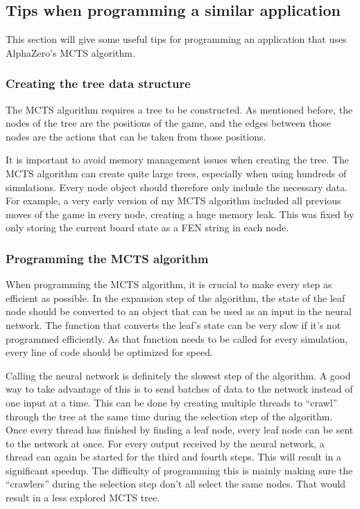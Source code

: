 \documentclass{article}
\begin{document}

\subsection{Tips when programming a similar application}

This section will give some useful tips for programming an application that uses
AlphaZero's MCTS algorithm. 

\subsubsection{Creating the tree data structure}

The MCTS algorithm requires a tree to be constructed. As mentioned before, the nodes of the tree
are the positions of the game, and the edges between those nodes are the actions that can be taken
from those positions. 

It is important to avoid memory management issues when creating the tree. The MCTS algorithm 
can create quite large trees, especially when using hundreds of simulations. Every node object
should therefore only include the necessary data. For example, a very early version of my MCTS algorithm 
included all previous moves of the game in every node, creating a huge memory leak. This was fixed
by only storing the current board state as a FEN string in each node.

\subsubsection{Programming the MCTS algorithm}

When programming the MCTS algorithm, it is crucial to make every step as efficient as possible.
In the expansion step of the algorithm, the state of the leaf node should be converted to an object
that can be used as an input in the neural network. The function that converts the leaf's state 
can be very slow if it's not programmed efficiently. As that function needs to be called for every
simulation, every line of code should be optimized for speed.

Calling the neural network is definitely the slowest step of the algorithm. A good way to take 
advantage of this is to send batches of data to the network instead of one input at a time. 
This can be done by creating multiple threads to ``crawl'' through the tree at the same time 
during the selection step of the algorithm. 
Once every thread has finished by finding a leaf node, every leaf node can be sent to the network at once. 
For every output received by the neural network, a thread can again be started for the third and fourth steps. 
This will result in a significant speedup. 
The difficulty of programming this is mainly making sure the ``crawlers'' during the selection step
don't all select the same nodes. That would result in a less explored MCTS tree.
\end{document}
